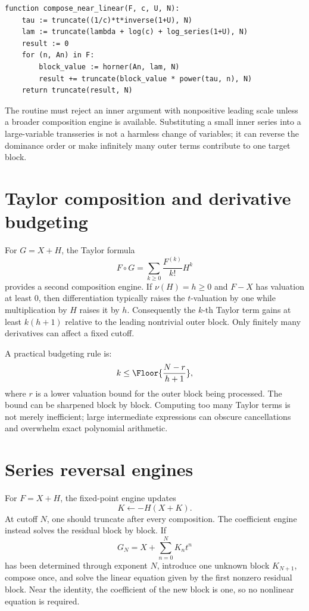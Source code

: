 \documentclass[11pt,openany]{book}
\theoremstyle{definition}
\theoremstyle{plain}
\theoremstyle{remark}
\newcommand{\val}{\nu}
\begin{document}
\begin{lstlisting}[style=pseudo,caption={Near-linear composition through a power cutoff}]
function compose_near_linear(F, c, U, N):
    tau := truncate((1/c)*t*inverse(1+U), N)
    lam := truncate(lambda + log(c) + log_series(1+U), N)
    result := 0
    for (n, An) in F:
        block_value := horner(An, lam, N)
        result += truncate(block_value * power(tau, n), N)
    return truncate(result, N)
\end{lstlisting}

The routine must reject an inner argument with nonpositive leading scale unless a broader composition engine is available. Substituting a small inner series into a large-variable transseries is not a harmless change of variables; it can reverse the dominance order or make infinitely many outer terms contribute to one target block.

\section{Taylor composition and derivative budgeting}
For \(G=X+H\), the Taylor formula
\[
 F\circ G=\sum_{k\ge0}\frac{F^{(k)}}{k!}H^k
\]
provides a second composition engine. If \(\val(H)=h\ge0\) and \(F-X\) has valuation at least \(0\), then differentiation typically raises the \(t\)-valuation by one while multiplication by \(H\) raises it by \(h\). Consequently the \(k\)-th Taylor term gains at least \(k(h+1)\) relative to the leading nontrivial outer block. Only finitely many derivatives can affect a fixed cutoff.

A practical budgeting rule is:
\begin{equation}\label{eq:Taylor-budget}
 k\le \Floor{\frac{N-r}{h+1}},
\end{equation}
where \(r\) is a lower valuation bound for the outer block being processed. The bound can be sharpened block by block. Computing too many Taylor terms is not merely inefficient; large intermediate expressions can obscure cancellations and overwhelm exact polynomial arithmetic.

\section{Series reversal engines}
For \(F=X+H\), the fixed-point engine updates
\begin{equation}\label{eq:implementation-fixedpoint}
 K\leftarrow-H(X+K).
\end{equation}
At cutoff \(N\), one should truncate after every composition. The coefficient engine instead solves the residual block by block. If
\[
 G_N=X+\sum_{n=0}^{N}K_nt^n
\]
has been determined through exponent \(N\), introduce one unknown block \(K_{N+1}\), compose once, and solve the linear equation given by the first nonzero residual block. Near the identity, the coefficient of the new block is one, so no nonlinear equation is required.
\end{document}
